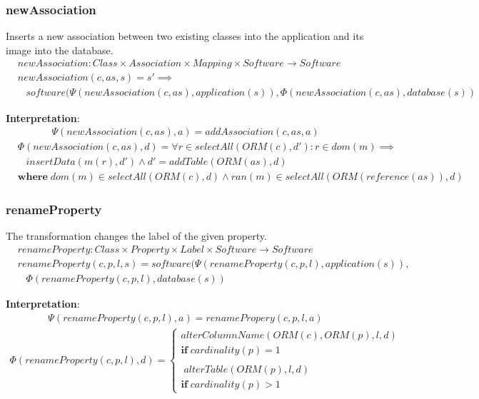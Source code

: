 \documentclass[10pt]{article}
\begin{document}
\subsubsection{newAssociation}
Inserts a new association between two existing classes into the application and its image into the database.
\begin{align}
& newAssociation: Class \times Association \times Mapping \times Software \rightarrow Software \\
& newAssociation(c, as, s) = s' \implies \nonumber \\ 
& \;\;\; software(\Psi(newAssociation(c, as), application(s)), \Phi(newAssociation(c, as), database(s))
\end{align}

\noindent \textbf{Interpretation}:
\begin{align}
\Psi(newAssociation(c, as), a) = addAssociation(c, as, a)
\end{align}
\begin{align}
& \Phi(newAssociation(c, as), d) = \forall r \in selectAll(ORM(c), d') : r \in dom(m) \implies \nonumber \\ & \;\;\; insertData(m(r), d') \land d' = addTable(ORM(as),  d) \nonumber \\
& \mathbf{where} \; dom(m) \in selectAll(ORM(c),d) \land ran(m) \in selectAll(ORM(reference(as)), d)
\end{align}


\subsubsection{renameProperty}
The transformation changes the label of the given property.
\begin{align}
& renameProperty: Class \times Property \times Label \times Software \rightarrow Software \nonumber \\
& renameProperty(c, p, l, s) = software(\Psi(renameProperty(c, p, l), application(s)),  \nonumber \\ 
& \;\;\; \Phi(renameProperty(c, p, l), database(s))
\end{align}

\noindent \textbf{Interpretation}:
\begin{align}
\Psi(renameProperty(c, p, l), a) = renamePropery(c, p, l, a) 
\end{align}
\begin{align}
\Phi(renameProperty(c, p, l), d) = \begin{cases}
  alterColumnName(ORM(c), ORM(p), l,  d) \\ \mathbf{if} \; cardinality(p) = 1  \\\\ 
  \; alterTable(ORM(p), l,  d) \\
  \mathbf{if} \; cardinality(p) > 1  
   \end{cases}
\end{align}
\end{document}
